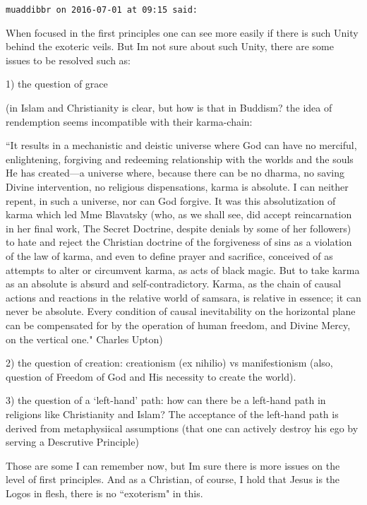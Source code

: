 \begin{footnotesize}\begin{sffamily}



\texttt{muaddibbr on 2016-07-01 at 09:15 said: }

When focused in the first principles one can see more easily if there is such Unity behind the exoteric veils. But Im not sure about such Unity, there are some issues to be resolved such as: 

1) the question of grace 

(in Islam and Christianity is clear, but how is that in Buddism? the idea of rendemption seems incompatible with their karma-chain: 

``It results in a mechanistic and deistic universe where God can have no merciful, enlightening, forgiving and redeeming relationship with the worlds and the souls He has created—a universe where, because there can be no dharma, no saving Divine intervention, no religious dispensations, karma is absolute. I can neither repent, in such a universe, nor can God forgive. It was this absolutization of karma which led Mme Blavatsky (who, as we shall see, did accept reincarnation in her final work, The Secret Doctrine, despite denials by some of her followers) to hate and reject the Christian doctrine of the forgiveness of sins as a violation of the law of karma, and even to define prayer and sacrifice, conceived of as attempts to alter or circumvent karma, as acts of black magic. But to take karma as an absolute is absurd and self-contradictory. Karma, as the chain of causal actions and reactions in the relative world of samsara, is relative in essence; it can never be absolute. Every condition of causal inevitability on the horizontal plane can be compensated for by the operation of human freedom, and Divine Mercy, on the vertical one." Charles Upton)

2) the question of creation: creationism (ex nihilio) vs manifestionism (also, question of Freedom of God and His necessity to create the world).

3) the question of a `left-hand' path: how can there be a left-hand path in religions like Christianity and Islam? The acceptance of the left-hand path is derived from metaphysiical assumptions (that one can actively destroy his ego by serving a Descrutive Principle)

Those are some I can remember now, but Im sure there is more issues on the level of first principles. And as a Christian, of course, I hold that Jesus is the Logos in flesh, there is no ``exoterism" in this.



\end{sffamily}
\end{footnotesize}
